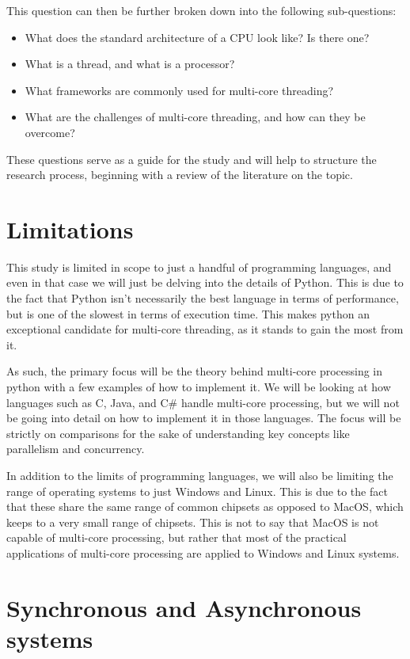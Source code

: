 \documentclass{article}
\begin{document}
This question can then be further broken down into the following sub-questions:

\begin{itemize}
    \item What does the standard architecture of a CPU look like? Is there one?
    \item What is a thread, and what is a processor?
    \item What frameworks are commonly used for multi-core threading?
    \item What are the challenges of multi-core threading, and how can they be overcome?
\end{itemize}

These questions serve as a guide for the study and will help to structure the research process, beginning with a review of the literature on the topic.

\section{Limitations}

This study is limited in scope to just a handful of programming languages, and even in that case we will just be delving into the details of Python. This is due to the fact that Python isn't necessarily the best language in terms of performance, but is one of the slowest in terms of execution time. This makes python an exceptional candidate for multi-core threading, as it stands to gain the most from it.

As such, the primary focus will be the theory behind multi-core processing in python with a few examples of how to implement it. We will be looking at how languages such as C, Java, and C\# handle multi-core processing, but we will not be going into detail on how to implement it in those languages. The focus will be strictly on comparisons for the sake of understanding key concepts like parallelism and concurrency.

In addition to the limits of programming languages, we will also be limiting the range of operating systems to just Windows and Linux. This is due to the fact that these share the same range of common chipsets as opposed to MacOS, which keeps to a very small range of chipsets. This is not to say that MacOS is not capable of multi-core processing, but rather that most of the practical applications of multi-core processing are applied to Windows and Linux systems.

\section{Synchronous and Asynchronous systems}
\end{document}
